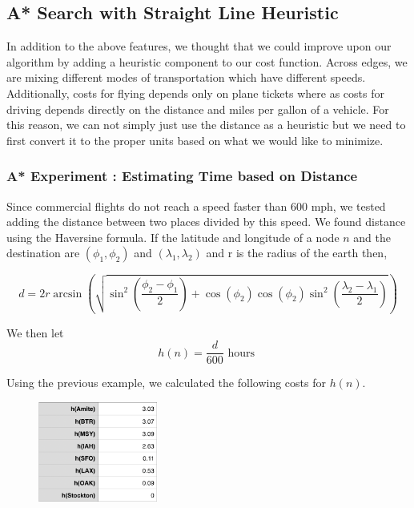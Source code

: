 \documentclass[11pt]{article}
\begin{document}
\pagebreak

\subsection{A* Search with Straight Line Heuristic}

In addition to the above features, we thought that we could improve upon our algorithm by adding a heuristic component to our cost function. 
Across edges, we are mixing different modes of transportation which have different speeds. Additionally, costs for flying depends only on plane tickets where as costs for driving depends directly on the distance and miles per gallon of a vehicle. 
For this reason, we can not simply just use the distance as a heuristic but we need to first convert it to the proper units based on what we would like to minimize.

\subsubsection{A* Experiment : Estimating Time based on Distance}

Since commercial flights do not reach a speed faster than 600 mph, we tested adding the distance between two places divided by this speed. 
We found distance using the Haversine formula. If the latitude and longitude of a node $n$ and the destination are $(\phi_1,\phi_2)$ and $(\lambda_1,\lambda_2)$ and r is the radius of the earth then,

$$d = 2r \arcsin \left( \sqrt{\sin^2 \left(\frac{\phi_2-\phi_1}{2} \right)+\cos(\phi_2) \cos(\phi_2) \sin^2 \left( \frac{\lambda_2 - \lambda_1}{2} \right)} \right)$$

We then let
$$h(n) = \frac{d}{600} \text{ hours }$$

Using the previous example, we calculated the following costs for $h(n)$.

\begin{figure}[!ht]
  \centering
  \includegraphics[width=0.35\textwidth]{hn}
  \label{fig:time_lim}
\end{figure}
\end{document}
